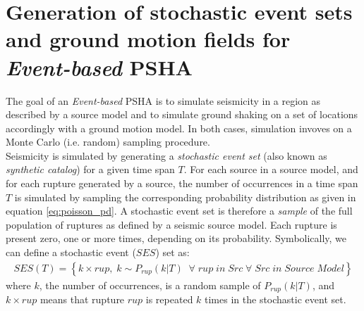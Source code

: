 \section{Generation of stochastic event sets and ground motion fields for \textit{Event-based} PSHA}
The goal of an \textit{Event-based} PSHA is to simulate seismicity in a region as described by a source model
and to simulate ground shaking on a set of locations accordingly with a ground motion model. In both
cases, simulation invoves on a Monte Carlo (i.e. random) sampling procedure.\\
Seismicity is simulated by generating a \textit{stochastic event set} (also known as \textit{synthetic catalog})
for a given time span $T$. For each source in a source model, and for each rupture generated by a source,
the number of occurrences in a time span $T$ is simulated by sampling the corresponding probability
distribution as given in equation \ref{eq:poisson_pd}. A stochastic event set is therefore a \textit{sample}
of the full population of ruptures as defined by a seismic source model. Each rupture is present zero, one or
more times, depending on its probability. Symbolically, we can define a stochastic event ($SES$) set as:
\begin{align}
SES(T) = \left\{k \times rup,\;k\sim P_{rup}(k | T)\;\;\forall\;rup\;in\;Src\;\forall\;Src\;in\;Source\;Model\right\}
\end{align}
where $k$, the number of occurrences, is a random sample of $P_{rup}(k | T)$, and $k \times rup$ means
that rupture $rup$ is repeated $k$ times in the stochastic event set.

